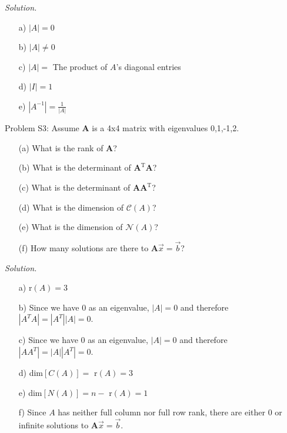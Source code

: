 \documentclass[12pt,pdftex]{article}
\begin{document}
\textit{Solution.}
\begin{itemize}
\item[a)] $|A|=0$
\item[b)] $|A|\neq0$
\item[c)] $|A|=$ The product of $A$'s diagonal entries
\item[d)] $|I|=1$
\item[e)] $|A^{-1}|=\frac{1}{|A|}$
\end{itemize}

\noindent Problem S3:  Assume $\mathbf{A}$ is a 4x4 matrix with eigenvalues 0,1,-1,2.
\begin{itemize}
\item[(a)] What is the rank of $\mathbf{A}$?
\item[(b)] What is the determinant of $\mathbf{A}^\text{T}\mathbf{A}$?
\item[(c)] What is the determinant of $\mathbf{A}\mathbf{A}^\text{T}$?
\item[(d)] What is the dimension of $\mathcal{C}(A)$? 
\item[(e)] What is the dimension of $\mathcal{N}(A)$?
\item[(f)] How many solutions are there to $\mathbf{A}\vec{x}=\vec{b}$? 
\end{itemize}

\textit{Solution.}
\begin{itemize}
\item[a)] r$(A)=3$
\item[b)] Since we have $0$ as an eigenvalue, $|A|=0$ and therefore $|A^TA|=|A^T||A|=0$.
\item[c)] Since we have $0$ as an eigenvalue, $|A|=0$ and therefore $|AA^T|=|A||A^T|=0$.
\item[d)] dim$[C(A)]=$ r$(A)=3$
\item[e)] dim$[N(A)]=n-$ r$(A)=1$
\item[f)] Since $A$ has neither full column nor full row rank, there are either $0$ or infinite solutions to $\mathbf{A}\vec{x}=\vec{b}$.
\end{itemize}
\end{document}
